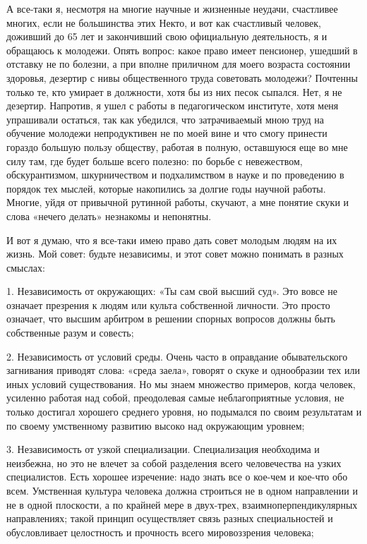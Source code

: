 А все-таки я, несмотря на многие научные и жизненные неудачи,
счастливее многих, если не большинства этих Некто, и вот как
счастливый человек, доживший до 65 лет и закончивший свою официальную
деятельность, я и обращаюсь к молодежи. Опять вопрос: какое право
имеет пенсионер, ушедший в отставку не по болезни, а при вполне
приличном для моего возраста состоянии здоровья, дезертир с нивы
общественного труда советовать молодежи? Почтенны только те, кто
умирает в должности, хотя бы из них песок сыпался. Нет, я не дезертир.
Напротив, я ушел с работы в педагогическом институте, хотя меня
упрашивали остаться, так как убедился, что затрачиваемый мною труд на
обучение молодежи непродуктивен не по моей вине и что смогу принести
гораздо большую пользу обществу, работая в полную, оставшуюся еще во
мне силу там, где будет больше всего полезно: по борьбе с невежеством,
обскурантизмом, шкурничеством и подхалимством в науке и по проведению
в порядок тех мыслей, которые накопились за долгие годы научной
работы. Многие, уйдя от привычной рутинной работы, скучают, а мне
понятие скуки и слова «нечего делать» незнакомы и непонятны.

И вот я думаю, что я все-таки имею право дать совет молодым людям на
их жизнь. Мой совет: будьте независимы, и этот совет можно понимать в
разных смыслах:

1. Независимость от окружающих: «Ты сам свой высший суд». Это вовсе не
означает презрения к людям или культа собственной личности. Это просто
означает, что высшим арбитром в решении спорных вопросов должны быть
собственные разум и совесть;

2. Независимость от условий среды. Очень часто в оправдание
обывательского загнивания приводят слова: «среда заела», говорят о
скуке и однообразии тех или иных условий существования. Но мы знаем
множество примеров, когда человек, усиленно работая над собой,
преодолевая самые неблагоприятные условия, не только достигал хорошего
среднего уровня, но подымался по своим результатам и по своему
умственному развитию высоко над окружающим уровнем;

3. Независимость от узкой специализации. Специализация необходима и
неизбежна, но это не влечет за собой разделения всего человечества на
узких специалистов. Есть хорошее изречение: надо знать все о кое-чем и
кое-что обо всем. Умственная культура человека должна строиться не в
одном направлении и не в одной плоскости, а по крайней мере в
двух-трех, взаимноперпендикулярных направлениях; такой принцип
осуществляет связь разных специальностей и обусловливает целостность и
прочность всего мировоззрения человека;

